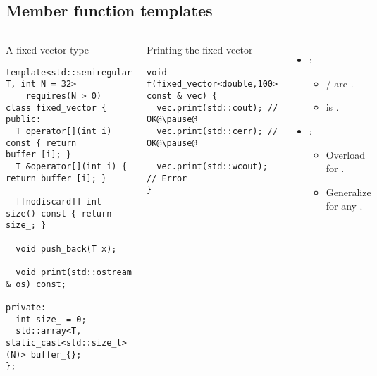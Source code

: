 \subsection{Member function templates}

\begin{frame}[t,fragile]

\begin{columns}[T]

\begin{block}{A fixed vector type}
\begin{lstlisting}
template<std::semiregular T, int N = 32> 
    requires(N > 0)
class fixed_vector {
public:
  T operator[](int i) const { return buffer_[i]; }
  T &operator[](int i) { return buffer_[i]; }

  [[nodiscard]] int size() const { return size_; }

  void push_back(T x);

  void print(std::ostream & os) const;

private:
  int size_ = 0;
  std::array<T, static_cast<std::size_t>(N)> buffer_{};
};
\end{lstlisting}
\end{block}

\pause
{}
\begin{block}{Printing the fixed vector}
\begin{lstlisting}[escapechar=@]
void f(fixed_vector<double,100> const & vec) {
  vec.print(std::cout); // OK@\pause@
  vec.print(std::cerr); // OK@\pause@

  vec.print(std::wcout); // Error
}
\end{lstlisting}
\end{block}

{\footnotesize \let\small\footnotesize
\begin{itemize}
  \pause
  \item {}:
    \begin{itemize}
      \item {}/ are .
      \item {} is .
    \end{itemize}

  \pause
  \item {}:
    \begin{itemize}
      \item Overload  for .
      \item Generalize for any .
    \end{itemize}
\end{itemize}
}

\end{columns}
\end{frame}


